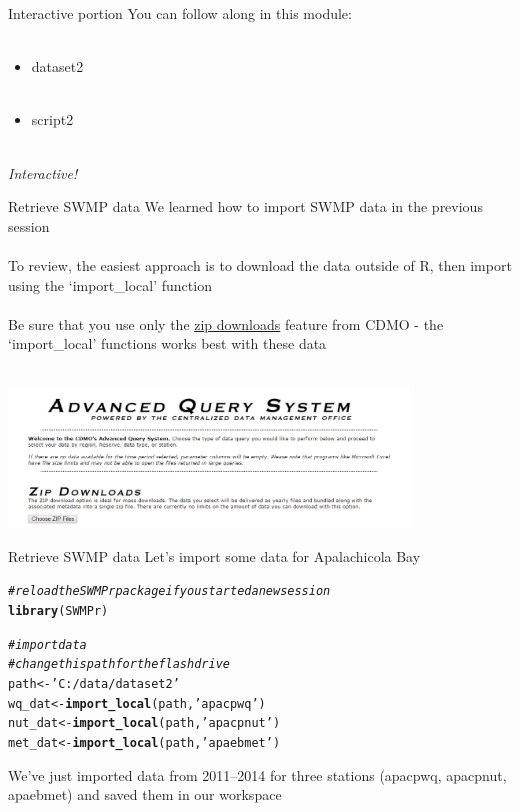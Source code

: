 \documentclass[xcolor=svgnames]{beamer}\usepackage[]{graphicx}\usepackage[]{color}
\makeatletter
\newcommand{\hlstr}[1]{\textcolor[rgb]{0.192,0.494,0.8}{#1}}%
\newcommand{\hlcom}[1]{\textcolor[rgb]{0.678,0.584,0.686}{\textit{#1}}}%
\newcommand{\hlstd}[1]{\textcolor[rgb]{0.345,0.345,0.345}{#1}}%
\newcommand{\hlkwb}[1]{\textcolor[rgb]{0.69,0.353,0.396}{#1}}%
\newcommand{\hlkwd}[1]{\textcolor[rgb]{0.737,0.353,0.396}{\textbf{#1}}}%
\newenvironment{kframe}{%
 \def\at@end@of@kframe{}%
 \ifinner\ifhmode%
  \def\at@end@of@kframe{\end{minipage}}%
  \begin{minipage}{\columnwidth}%
 \fi\fi%
 \def\FrameCommand##1{\hskip\@totalleftmargin \hskip-\fboxsep
 \colorbox{shadecolor}{##1}\hskip-\fboxsep
     \hskip-\linewidth \hskip-\@totalleftmargin \hskip\columnwidth}%
 \MakeFramed {\advance\hsize-\width
   \@totalleftmargin\z@ \linewidth\hsize
   \@setminipage}}%
 {\par\unskip\endMakeFramed%
 \at@end@of@kframe}
\newenvironment{knitrout}{}{} %
\makeatother
\begin{document}
\begin{frame}{Interactive portion}
You can follow along in this module: \\~\\
\begin{itemize}
\item dataset2 \\~\\
\item script2 \\~\\
\end{itemize}
\Large
\centerline{\emph{Interactive!}}
\end{frame}

\begin{frame}{Retrieve SWMP data}
We learned how to import SWMP data in the previous session \\~\\
To review, the easiest approach is to download the data outside of R, then import using the `import\_local' function \\~\\
Be sure that you use only the \href{http://cdmo.baruch.sc.edu/aqs/zips.cfm}{zip downloads} feature from CDMO - the `import\_local' functions works best with these data \\~\\
\centerline{\includegraphics[width = 0.8\textwidth]{adv_query.png}}
\end{frame}

\begin{frame}[containsverbatim]{Retrieve SWMP data}
Let's import some data for Apalachicola Bay

\begin{knitrout}\scriptsize
{}\color{fgcolor}\begin{kframe}
\begin{alltt}
\hlcom{# reload the SWMPr package if you started a new session}
\hlkwd{library}\hlstd{(SWMPr)}

\hlcom{# import data}
\hlcom{# change this path for the flash drive}
\hlstd{path} \hlkwb{<-} \hlstr{'C:/data/dataset2'}
\hlstd{wq_dat} \hlkwb{<-} \hlkwd{import_local}\hlstd{(path,} \hlstr{'apacpwq'}\hlstd{)}
\hlstd{nut_dat} \hlkwb{<-} \hlkwd{import_local}\hlstd{(path,} \hlstr{'apacpnut'}\hlstd{)}
\hlstd{met_dat} \hlkwb{<-} \hlkwd{import_local}\hlstd{(path,} \hlstr{'apaebmet'}\hlstd{)}
\end{alltt}
\end{kframe}
\end{knitrout}
We've just imported data from 2011--2014 for three stations (apacpwq, apacpnut, apaebmet) and saved them in our workspace
\end{frame}
\end{document}
